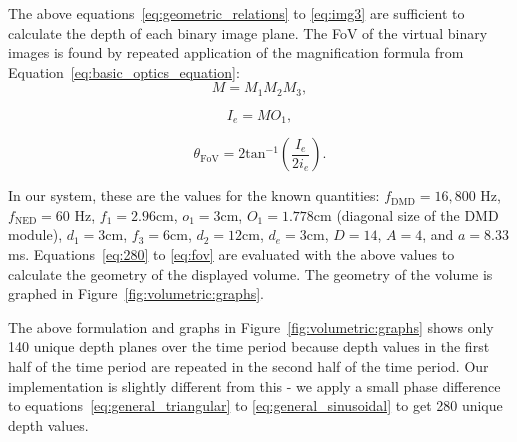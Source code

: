 The above equations~\eqref{eq:geometric_relations} to \eqref{eq:img3} are sufficient to calculate the depth of each binary image plane. The FoV of the virtual binary images is found by repeated application of the magnification formula from  Equation~\eqref{eq:basic_optics_equation}:
\begin{equation}
M = M_1M_2M_3,
\label{eq:combined_magnification}
\end{equation}

\begin{equation}
I_e = MO_1,
\label{eq:virtual_image_size}
\end{equation}

\begin{equation}
\theta_{\text{FoV}} = 2\text{tan}^{-1}\left(\frac{I_e}{2i_e}\right).
\label{eq:fov}
\end{equation}

In our system, these are the values for the known quantities: $f_{\text{DMD}} = 16,800$ Hz, $f_{\text{NED}} = 60$ Hz, $f_1 = 2.96$cm, $o_1 = 3$cm, $O_1 = 1.778$cm (diagonal size of the DMD module), $d_1 = 3$cm, $f_3 = 6$cm, $d_2 = 12$cm, $d_e = 3$cm, $D = 14$, $A = 4$, and $a = 8.33$ ms. Equations~\eqref{eq:280} to \eqref{eq:fov} are evaluated with the above values to calculate the geometry of the displayed volume. The geometry of the volume is graphed in Figure~\ref{fig:volumetric:graphs}. 

The above formulation and graphs in Figure~\ref{fig:volumetric:graphs} shows only 140 unique depth planes over the time period because depth values in the first half of the time period are repeated in the second half of the time period. Our implementation is slightly different from this - we apply a small phase difference to equations~\eqref{eq:general_triangular} to \eqref{eq:general_sinusoidal} to get 280 unique depth values. 

